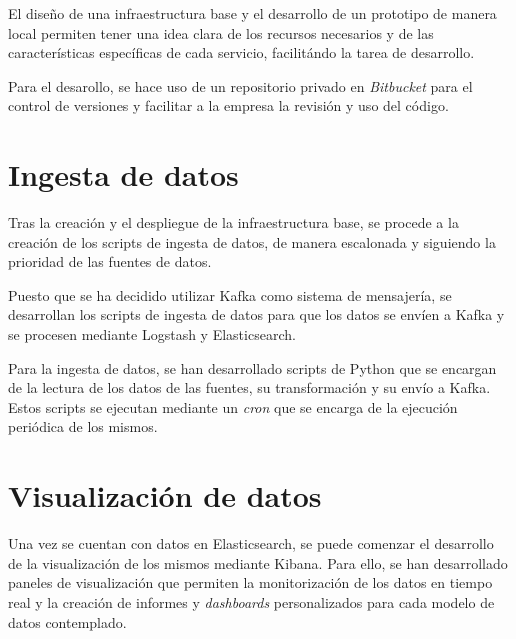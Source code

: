 El diseño de una infraestructura base y el desarrollo de un prototipo de manera
local permiten tener una idea clara de los recursos necesarios y de las
características específicas de cada servicio, facilitándo la tarea de
desarrollo.


Para el desarollo, se hace uso de un repositorio privado en \textit{Bitbucket}
para el control de versiones y facilitar a la empresa la revisión y uso del
código.



\newpage{}
\section{Ingesta de datos}\label{sec:impl_ingesta}
Tras la creación y el despliegue de la infraestructura base, se procede a la
creación de los scripts de ingesta de datos, de manera escalonada y siguiendo
la prioridad de las fuentes de datos.

Puesto que se ha decidido utilizar Kafka como sistema de mensajería, se
desarrollan los scripts de ingesta de datos para que los datos se envíen a
Kafka y se procesen mediante Logstash y Elasticsearch.

Para la ingesta de datos, se han desarrollado scripts de Python que se encargan
de la lectura de los datos de las fuentes, su transformación y su envío a Kafka.
Estos scripts se ejecutan mediante un \textit{cron} que se encarga de la
ejecución periódica de los mismos.


\newpage{}
\section{Visualización de datos}\label{sec:impl_visualizacion}
Una vez se cuentan con datos en Elasticsearch, se puede comenzar el desarrollo
de la visualización de los mismos mediante Kibana. Para ello, se han desarrollado
paneles de visualización que permiten la monitorización de los datos en tiempo
real y la creación de informes y \textit{dashboards} personalizados para cada
modelo de datos contemplado.
